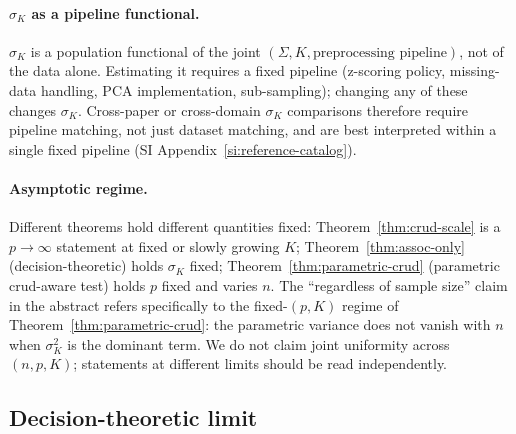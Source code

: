 \paragraph{$\sigma_K$ as a pipeline functional.} $\sigma_K$ is a population functional of the joint $(\Sigma, K, \text{preprocessing pipeline})$, not of the data alone. Estimating it requires a fixed pipeline (z-scoring policy, missing-data handling, PCA implementation, sub-sampling); changing any of these changes $\sigma_K$. Cross-paper or cross-domain $\sigma_K$ comparisons therefore require pipeline matching, not just dataset matching, and are best interpreted within a single fixed pipeline (SI Appendix~\ref{si:reference-catalog}).

\paragraph{Asymptotic regime.} Different theorems hold different quantities fixed: Theorem~\ref{thm:crud-scale} is a $p\to\infty$ statement at fixed or slowly growing $K$; Theorem~\ref{thm:assoc-only} (decision-theoretic) holds $\sigma_K$ fixed; Theorem~\ref{thm:parametric-crud} (parametric crud-aware test) holds $p$ fixed and varies $n$. The ``regardless of sample size'' claim in the abstract refers specifically to the fixed-$(p,K)$ regime of Theorem~\ref{thm:parametric-crud}: the parametric variance does not vanish with $n$ when $\sigma_K^2$ is the dominant term. We do not claim joint uniformity across $(n,p,K)$; statements at different limits should be read independently.

\subsection{Decision-theoretic limit}

